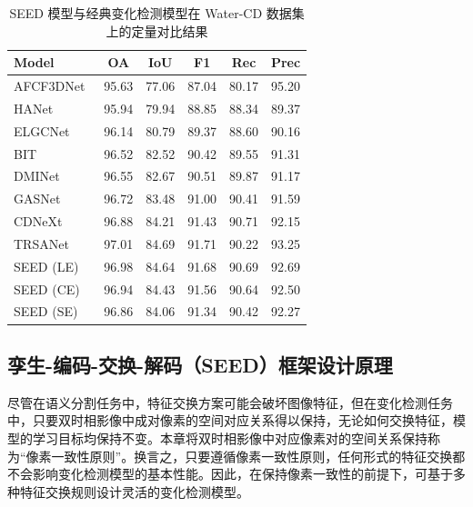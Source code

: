 \begin{table}[!htbp]
\centering
\caption{SEED 模型与经典变化检测模型在 Water-CD 数据集上的定量对比结果}
\label{tab:seed_watercd}
\begin{tabular}{lccccc}
\hline
\textbf{Model} & \textbf{OA} & \textbf{IoU} & \textbf{F1} & \textbf{Rec} & \textbf{Prec} \\
\hline
AFCF3DNet~\cite{ye_adjacent-level_2023} & 95.63 & 77.06 & 87.04 & 80.17 & 95.20 \\
HANet~\cite{Han2024HANetAH}    & 95.94 & 79.94 & 88.85 & 88.34 & 89.37 \\
ELGCNet~\cite{m_noman_elgc-net_2024}   & 96.14 & 80.79 & 89.37 & 88.60 & 90.16 \\
BIT~\cite{chen_remote_2022}           & 96.52 & 82.52 & 90.42 & 89.55 & 91.31 \\
DMINet~\cite{feng_change_2023}         & 96.55 & 82.67 & 90.51 & 89.87 & 91.17 \\
GASNet~\cite{zhang_global-aware_2023}    & 96.72 & 83.48 & 91.00 & 90.41 & 91.59 \\
CDNeXt~\cite{wei_robust_2024}        & 96.88 & 84.21 & 91.43 & 90.71 & 92.15 \\
TRSANet~\cite{j_li_trsanet_2024}     & 97.01 & 84.69 & 91.71 & 90.22 & 93.25 \\
\hline
SEED (LE)          & 96.98 & 84.64 & 91.68 & 90.69 & 92.69 \\
SEED (CE) & 96.94	& 84.43	& 91.56	& 90.64	& 92.50 \\
SEED (SE) & 96.86	& 84.06	& 91.34	& 90.42	& 92.27 \\
\hline
\end{tabular}
\end{table}


\subsection{孪生-编码-交换-解码（SEED）框架设计原理}
尽管在语义分割任务中，特征交换方案可能会破坏图像特征，但在变化检测任务中，只要双时相影像中成对像素的空间对应关系得以保持，无论如何交换特征，模型的学习目标均保持不变。本章将双时相影像中对应像素对的空间关系保持称为“像素一致性原则”。换言之，只要遵循像素一致性原则，任何形式的特征交换都不会影响变化检测模型的基本性能。因此，在保持像素一致性的前提下，可基于多种特征交换规则设计灵活的变化检测模型。  


